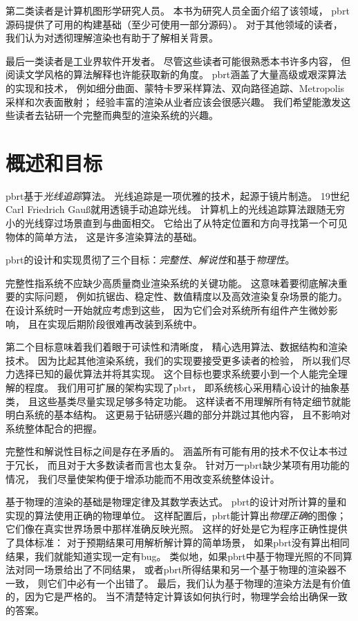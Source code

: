 第二类读者是计算机图形学研究人员。
本书为研究人员全面介绍了该领域，
pbrt源码提供了可用的构建基础（至少可使用一部分源码）。
对于其他领域的读者，
我们认为对透彻理解渲染也有助于了解相关背景。

最后一类读者是工业界软件开发者。
尽管这些读者可能很熟悉本书许多内容，
但阅读文学风格的算法解释也许能获取新的角度。
pbrt涵盖了大量高级或艰深算法的实现和技术，
例如细分曲面、蒙特卡罗采样算法、双向路径追踪、Metropolis采样和次表面散射；
经验丰富的渲染从业者应该会很感兴趣。
我们希望能激发这些读者去钻研一个完整而典型的渲染系统的兴趣。

\section*{概述和目标}\label{sec:概述和目标}

pbrt基于{\itshape 光线追踪}算法。
光线追踪是一项优雅的技术，起源于镜片制造。
19世纪Carl Friedrich Gau{\ss}就用透镜手动追踪光线。
计算机上的光线追踪算法跟随无穷小的光线穿过场景直到与曲面相交。
它给出了从特定位置和方向寻找第一个可见物体的简单方法，
这是许多渲染算法的基础。

pbrt的设计和实现贯彻了三个目标：{\itshape 完整性}、{\itshape 解说性}和基于{\itshape 物理性}。

完整性指系统不应缺少高质量商业渲染系统的关键功能。
这意味着要彻底解决重要的实际问题，
例如抗锯齿、稳定性、数值精度以及高效渲染复杂场景的能力。
在设计系统时一开始就应考虑到这些，
因为它们会对系统所有组件产生微妙影响，
且在实现后期阶段很难再改装到系统中。

第二个目标意味着我们着眼于可读性和清晰度，
精心选用算法、数据结构和渲染技术。
因为比起其他渲染系统，我们的实现要接受更多读者的检验，
所以我们尽力选择已知的最优算法并将其实现。
这个目标也要求系统要小到一个人能完全理解的程度。
我们用可扩展的架构实现了pbrt，
即系统核心采用精心设计的抽象基类，
且这些基类尽量实现足够多特定功能。
这样读者不用理解所有特定细节就能明白系统的基本结构。
这更易于钻研感兴趣的部分并跳过其他内容，
且不影响对系统整体配合的把握。

完整性和解说性目标之间是存在矛盾的。
涵盖所有可能有用的技术不仅让本书过于冗长，
而且对于大多数读者而言也太复杂。
针对万一pbrt缺少某项有用功能的情况，
我们尽量使架构便于增添功能而不用改变系统整体设计。

基于物理的渲染的基础是物理定律及其数学表达式。
pbrt的设计对所计算的量和实现的算法使用正确的物理单位。
这样配置后，pbrt能计算出{\itshape 物理正确}的图像；
它们像在真实世界场景中那样准确反映光照。
这样的好处是它为程序正确性提供了具体标准：
对于预期结果可用解析解计算的简单场景，
如果pbrt没有算出相同结果，我们就能知道实现一定有bug。
类似地，如果pbrt中基于物理光照的不同算法对同一场景给出了不同结果，
或者pbrt所得结果和另一个基于物理的渲染器不一致，
则它们中必有一个出错了。
最后，我们认为基于物理的渲染方法是有价值的，因为它是严格的。
当不清楚特定计算该如何执行时，物理学会给出确保一致的答案。

